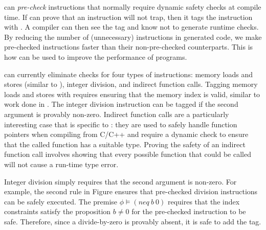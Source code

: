 \name can \emph{pre-check} instructions that normally require dynamic safety checks at compile time.
If \name can prove that an instruction will not trap, then it tags the instruction with \prechk.
A compiler can then see the \prechk tag and know not to generate runtime checks.
By reducing the number of (unnecessary) instructions in generated code, we make pre-checked instructions faster than their non-pre-checked counterparts.
This is how \name can be used to improve the performance of \wasm programs.

\name can currently eliminate checks for four types of instructions: memory loads and stores (similar to \dtal), integer division, and indirect function calls.
Tagging memory loads and stores with \prechk requires ensuring that the memory index is valid, similar to work done in \dtal.
The integer division instruction can be \prechk tagged if the second argument is provably non-zero.
Indirect function calls are a particularly interesting case that is specific to \wasm: they are used to safely handle function pointers when compiling from C/C++ and require a dynamic check to ensure that the called function has a suitable type.
Proving the safety of an indirect function call involves showing that every possible function that could be called will not cause a run-time type error.

Integer division simply requires that the second argument is non-zero.
For example, the second rule in Figure  ensures that pre-checked division instructions can be safely executed.
The premise $\phi \models (neq\ b\ 0)$ requires that the index constraints satisfy the proposition $b \neq 0$ for the pre-checked instruction to be safe.
Therefore, since a divide-by-zero is provably absent, it is safe to add the \prechk tag.


